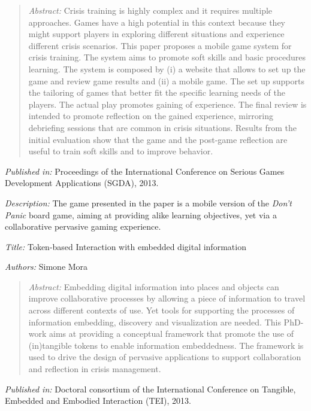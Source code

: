 \begin{quote}
	\emph{Abstract: } Crisis training is highly complex and it requires multiple approaches. Games have a high potential in this context because they might support players in exploring different situations and experience different crisis scenarios. This paper proposes a mobile game system for crisis training. The system aims to promote soft skills and basic procedures learning. The system is composed by (i) a website that allows to set up the game and review game results and (ii) a mobile game. The set up supports the tailoring of games that better fit the specific learning needs of the players. The actual play promotes gaining of experience. The final review is intended to promote reflection on the gained experience, mirroring debriefing sessions that are common in crisis situations. Results from the initial evaluation show that the game and the post-game reflection are useful to train soft skills and to improve behavior.	
\end{quote}

\emph{Published in: }Proceedings of the International Conference on Serious Games Development Applications (SGDA), 2013.

\emph{Description: }The game presented in the paper is a mobile version of the \emph{Don't Panic} board game, aiming at providing alike learning objectives, yet via a collaborative pervasive gaming experience.


\emph{Title: }Token-based Interaction with embedded digital information

\emph{Authors: }Simone Mora

\begin{quote}
	\emph{Abstract: }Embedding digital information into places and objects can improve collaborative processes by allowing a piece of information to travel across different contexts of use. Yet tools for supporting the processes of information embedding, discovery and visualization are needed. This PhD-work aims at providing a conceptual framework that promote the use of (in)tangible tokens to enable information embeddedness. The framework is used to drive the design of pervasive applications to support collaboration and reflection in crisis management.
\end{quote}

\emph{Published in: }Doctoral consortium of the International Conference on Tangible, Embedded and Embodied Interaction (TEI), 2013.

